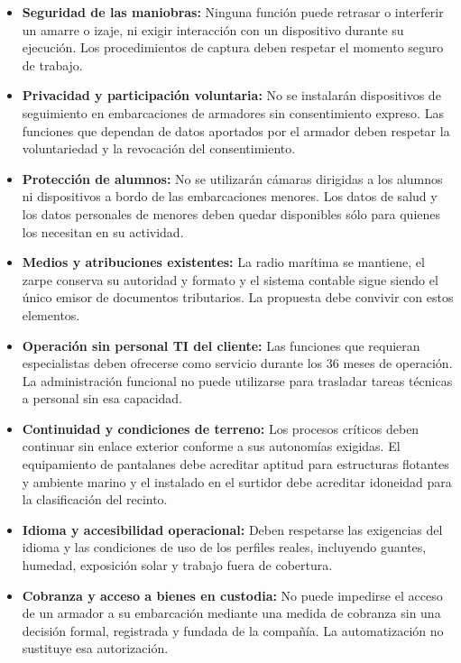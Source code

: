 \begin{itemize}
    \item \textbf{Seguridad de las maniobras:} Ninguna función puede retrasar o interferir un amarre o izaje, ni exigir interacción con un dispositivo durante su ejecución. Los procedimientos de captura deben respetar el momento seguro de trabajo.
    \item \textbf{Privacidad y participación voluntaria:} No se instalarán dispositivos de seguimiento en embarcaciones de armadores sin consentimiento expreso. Las funciones que dependan de datos aportados por el armador deben respetar la voluntariedad y la revocación del consentimiento.
    \item \textbf{Protección de alumnos:} No se utilizarán cámaras dirigidas a los alumnos ni dispositivos a bordo de las embarcaciones menores. Los datos de salud y los datos personales de menores deben quedar disponibles sólo para quienes los necesitan en su actividad.
    \item \textbf{Medios y atribuciones existentes:} La radio marítima se mantiene, el zarpe conserva su autoridad y formato y el sistema contable sigue siendo el único emisor de documentos tributarios. La propuesta debe convivir con estos elementos.
    \item \textbf{Operación sin personal TI del cliente:} Las funciones que requieran especialistas deben ofrecerse como servicio durante los 36 meses de operación. La administración funcional no puede utilizarse para trasladar tareas técnicas a personal sin esa capacidad.
    \item \textbf{Continuidad y condiciones de terreno:} Los procesos críticos deben continuar sin enlace exterior conforme a sus autonomías exigidas. El equipamiento de pantalanes debe acreditar aptitud para estructuras flotantes y ambiente marino y el instalado en el surtidor debe acreditar idoneidad para la clasificación del recinto.
    \item \textbf{Idioma y accesibilidad operacional:} Deben respetarse las exigencias del idioma y las condiciones de uso de los perfiles reales, incluyendo guantes, humedad, exposición solar y trabajo fuera de cobertura.
    \item \textbf{Cobranza y acceso a bienes en custodia:} No puede impedirse el acceso de un armador a su embarcación mediante una medida de cobranza sin una decisión formal, registrada y fundada de la compañía. La automatización no sustituye esa autorización.
\end{itemize}

